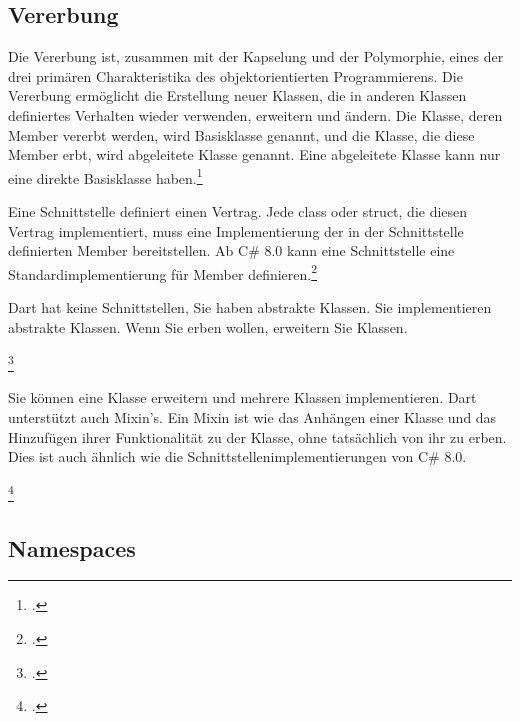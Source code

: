 \subsection{Vererbung}

Die Vererbung ist, zusammen mit der Kapselung und der Polymorphie, eines der drei primären Charakteristika des objektorientierten Programmierens. Die Vererbung ermöglicht die Erstellung neuer Klassen, die in anderen Klassen definiertes Verhalten wieder verwenden, erweitern und ändern. Die Klasse, deren Member vererbt werden, wird Basisklasse genannt, und die Klasse, die diese Member erbt, wird abgeleitete Klasse genannt. Eine abgeleitete Klasse kann nur eine direkte Basisklasse haben.\footcite[Vgl.  veerbung
][Abgerufen am \today]{GoogleFlutterSharedPreferences2020} 

Eine Schnittstelle definiert einen Vertrag. Jede class oder struct, die diesen Vertrag implementiert, muss eine Implementierung der in der Schnittstelle definierten Member bereitstellen. Ab C\# 8.0 kann eine Schnittstelle eine Standardimplementierung für Member definieren.\footcite[Vgl. interface (C\#-Referenz)][Abgerufen am \today]{GoogleFlutterSharedPreferences2020} 

Dart hat keine Schnittstellen, Sie haben abstrakte Klassen. Sie implementieren abstrakte Klassen. Wenn Sie erben wollen, erweitern Sie Klassen.

\begin{minipage}{\linewidth}

\end{minipage}
\footcitetext[In Anlehnung an ][Abgerufen am \today]{Pedley2019}

Sie können eine Klasse erweitern und mehrere Klassen implementieren. Dart unterstützt auch Mixin's. Ein Mixin ist wie das Anhängen einer Klasse und das Hinzufügen ihrer Funktionalität zu der Klasse, ohne tatsächlich von ihr zu erben. Dies ist auch ähnlich wie die Schnittstellenimplementierungen von C\# 8.0.

\begin{minipage}{\linewidth}

\end{minipage}
\footcitetext[In Anlehnung an ][Abgerufen am \today]{Pedley2019}

\subsection{Namespaces}

